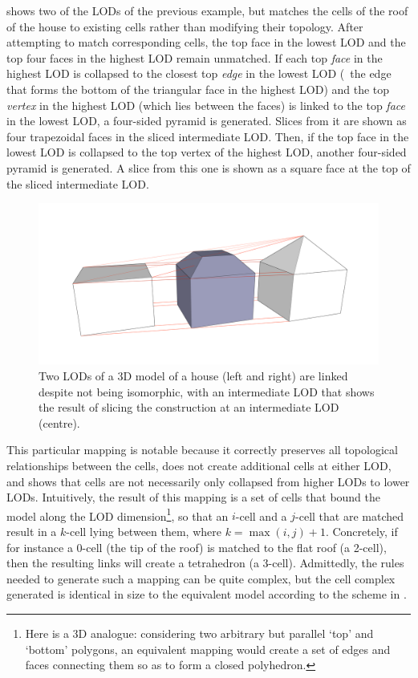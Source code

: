  shows two of the LODs of the previous example, but matches the cells of the roof of the house to existing cells rather than modifying their topology.
After attempting to match corresponding cells, the top face in the lowest LOD and the top four faces in the highest LOD remain unmatched.
If each top \emph{face} in the highest LOD is collapsed to the closest top \emph{edge} in the lowest LOD (\ie\ the edge that forms the bottom of the triangular face in the highest LOD) and the top \emph{vertex} in the highest LOD (which lies between the faces) is linked to the top \emph{face} in the lowest LOD, a four-sided pyramid is generated.
Slices from it are shown as four trapezoidal faces in the sliced intermediate LOD.\@
Then, if the top face in the lowest LOD is collapsed to the top vertex of the highest LOD, another four-sided pyramid is generated.
A slice from this one is shown as a square face at the top of the sliced intermediate LOD.\@
\begin{figure}[tb]
   \centering
   \includegraphics[width=\linewidth]{figs/link2}
   \caption[Linking by matching cells]{Two LODs of a 3D model of a house (left and right) are linked despite not being isomorphic, with an intermediate LOD that shows the result of slicing the construction at an intermediate LOD (centre).}
\label{fig:link2}
\end{figure}

This particular mapping is notable because it correctly preserves all topological relationships between the cells, does not create additional cells at either LOD, and shows that cells are not necessarily only collapsed from higher LODs to lower LODs.
Intuitively, the result of this mapping is a set of cells that bound the model along the LOD dimension\footnote{Here is a 3D analogue: considering two arbitrary but parallel `top' and `bottom' polygons, an equivalent mapping would create a set of edges and faces connecting them so as to form a closed polyhedron.}, so that an $i$-cell and a $j$-cell that are matched result in a $k$-cell lying between them, where $k = \max(i, j)+1$.
Concretely, if for instance a 0-cell (the tip of the roof) is matched to the flat roof (a 2-cell), then the resulting links will create a tetrahedron (a 3-cell).
Admittedly, the rules needed to generate such a mapping can be quite complex, but the cell complex generated is identical in size to the equivalent model according to the scheme in .

